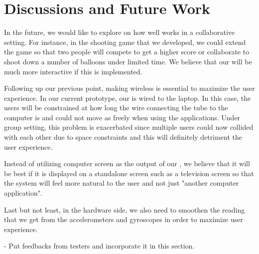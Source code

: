 \section{Discussions and Future Work}\label{sec:fut-work}
In the future, we would like to explore on how well \tube works in a collaborative setting. For instance, in the shooting game that we developed, we could extend the game so that two people will compete to get a higher score or collaborate to shoot down a number of balloons under limited time. We believe that our \tube will be much more interactive if this is implemented.

Following up our previous point, making \tube wireless is essential to maximize the user experience. In our current prototype, our \tube is wired to the laptop. In this case, the users will be constrained at how long the wire connecting the tube to the computer is and could not move as freely when using the applications. Under group setting, this problem is exacerbated since multiple users could now collided with each other due to space constraints and this will definitely detriment the user experience.

Instead of utilizing computer screen as the output of our \tube, we believe that it will be best if it is displayed on a standalone screen such as a television screen so that the \tube system will feel more natural to the user and not just "another computer application".

Last but not least, in the hardware side, we also need to smoothen the reading that we get from the accelerometers and gyroscopes in order to maximize user experience.

\TODO
- Put feedbacks from testers and incorporate it in this section.
